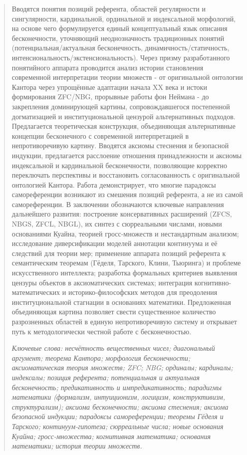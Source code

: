 \documentclass[12pt]{article}
\begin{document}
\begin{abstract}
Вводятся понятия позиций референта, областей регулярности и сингулярности, кардинальной, ординальной и индексальной морфологий, на основе чего формулируется единый концептуальный язык описания бесконечности, уточняющий неоднозначность традиционных понятий (потенциальная/актуальная бесконечность, динамичность/статичность, интенсиональность/экстенсиональность). Через призму разработанного понятийного аппарата проводится анализ истории становления современной интерпретации теории множеств - от оригинальной онтологии Кантора через упрощённые адаптации начала XX века и истоки формирования ZFC/NBG, прорывные работы фон Неймана - до закрепления доминирующей картины, сопровождавшегося постепенной догматизацией и институциональной цензурой альтернативных подходов. Предлагается теоретическая конструкция, объединяющая альтернативные концепции бесконечного с современной интерпретацией в непротиворечивую картину. Вводятся аксиомы стеснения и безопасной индукции, предлагается расслоение отношения принадлежности и аксиомы индексальной и кардинальной бесконечности, позволяющие корректно переключать перспективы и восстановить согласованность с оригинальной онтологией Кантора. Работа демонстрирует, что многие парадоксы самореференции возникают из смешения позиций референта, а не из самой самореференции. В заключении обозначаются ключевые направления дальнейшего развития: построение консервативных расширений (ZFCS, NBGS, ZFCL, NBGL), их синтез с сюрреальными числами, новыми основаниями Куайна, теорией гросс-множеств и нестандартным анализом; исследование диверсификации моделей аннотации континуума и её следствий для теории мер; применение аппарата позиций референта к семантическим теоремам (Гёделя, Тарского, Клини, Тьюринга) и проблеме искусственного интеллекта; разработка формальных критериев выявления цензуры объектов в аксиоматических системах; интеграция когнитивно-математических и историко-философских методов для преодоления институциональной стагнации в основаниях математики. Предложенная объединяющая картина позволяет свести существенное количество разрозненных областей в единую непротиворечивую систему и открывает путь к методологически честной работе с бесконечностью.

{\it Ключевые слова: несчётность вещественных чисел; диагональный аргумент; теорема Кантора; морфология бесконечности; аксиоматическая теория множеств; ZFC; NBG; ординалы; кардиналы; индексалы; позиция референта; потенциальная и актуальная бесконечность; предикативность и импредикативность; парадигмы математики (формализм, интуиционизм, логицизм, конструктивизм, структурализм); аксиома бесконечности; аксиома стеснения; аксиома безопасной индукции; парадоксы самореференции; теоремы Гёделя и Тарского; континуум-гипотеза; сюрреальные числа; новые основания Куайна; гросс-множества; когнитивная математика; основания математики; история теории множеств.}

\end{abstract}
\end{document}
